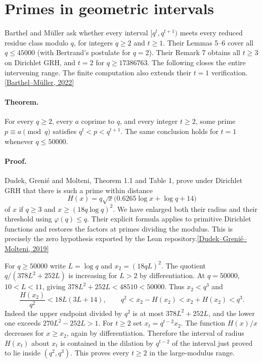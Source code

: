 \section{Primes in geometric intervals}
Barthel and M\"uller ask whether every interval $[q^t,q^{t+1})$ meets every
reduced residue class modulo $q$, for integers $q\ge2$ and $t\ge1$.
Their Lemmas 5--6 cover all $q\le45000$ (with Bertrand's postulate for $q=2$).
Their Remark 7 obtains all $t\ge3$ on Dirichlet GRH, and $t=2$ for
$q\ge17386763$. The following closes the entire intervening range. The
finite computation also extends their $t=1$ verification.
\hfill\href{https://doi.org/10.1080/00029890.2022.2116250}{[Barthel--M\"uller, 2022]}

\paragraph{Theorem.} For every $q\ge2$, every $a$ coprime to $q$, and
every integer $t\ge2$, some prime $p\equiv a\pmod q$ satisfies
$q^t<p<q^{t+1}$. The same conclusion holds for $t=1$ whenever $q\le50000$.

\paragraph{Proof.}
Dudek, Greni\'e and Molteni, Theorem 1.1 and Table 1, prove under Dirichlet
GRH that there is such a prime within distance
\[
 H(x)=q\sqrt x\bigl(0.6265\log x+\log q+14\bigr)
\]
of $x$ if $q\ge3$ and $x\ge(18q\log q)^2$. We have enlarged both their
radius and their threshold using $\varphi(q)\le q$. Their explicit formula
applies to primitive Dirichlet functions and restores the factors at primes
dividing the modulus. This is precisely the zero hypothesis exported by the
Lean repository.\hfill\href{https://doi.org/10.1142/S1793042119500441}{[Dudek--Greni\'e--Molteni, 2019]}

For $q\ge50000$ write $L=\log q$ and $x_2=(18qL)^2$.
The quotient $q/(378L^2+252L)$ is increasing for $L>2$ by
differentiation. At $q=50000$, $10<L<11$, giving
$378L^2+252L<48510<50000$. Thus $x_2<q^3$ and
\[
 \frac{H(x_2)}{q^2}<18L(3L+14),\qquad
 q^2<x_2-H(x_2)<x_2+H(x_2)<q^3.
\]
Indeed the upper endpoint divided by $q^2$ is at most $378L^2+252L$,
and the lower one exceeds $270L^2-252L>1$. For $t\ge2$ set
$x_t=q^{t-2}x_2$. The function $H(x)/x$ decreases for $x\ge x_2$,
again by differentiation. Therefore the interval of radius $H(x_t)$
about $x_t$ is contained in the dilation by $q^{t-2}$ of the interval
just proved to lie inside $(q^2,q^3)$. This proves every $t\ge2$ in the
large-modulus range.

